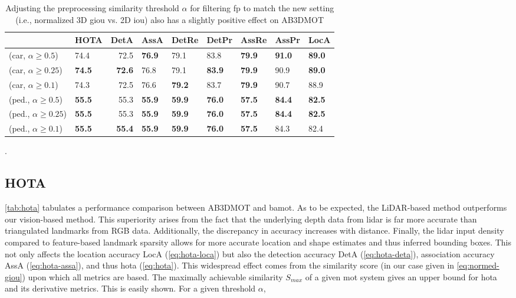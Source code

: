 \documentclass[headsepline, hidelinks, footsepline, footinclude=false, oneside, fontsize=11pt, paper=a4, listof=totoc, bibliography=totoc]{scrbook}
\begin{document}
\begin{table}
\centering
{} {

\begin{tabular}{llrllllll}
 & HOTA & DetA & AssA & DetRe & DetPr & AssRe & AssPr & LocA\\
\hline
\cite{wengBaseline3DMultiObject2019} (car, \(\alpha \geq 0.5\)) & 74.4 & 72.5 & \textbf{76.9} & 79.1 & 83.8 & \textbf{79.9} & \textbf{91.0} & \textbf{89.0}\\
\cite{wengBaseline3DMultiObject2019} (car, \(\alpha \geq 0.25\)) & \textbf{74.5} & \textbf{72.6} & 76.8 & 79.1 & \textbf{83.9} & \textbf{79.9} & 90.9 & \textbf{89.0}\\
\cite{wengBaseline3DMultiObject2019} (car, \(\alpha \geq 0.1\)) & 74.3 & 72.5 & 76.6 & \textbf{79.2} & 83.7 & \textbf{79.9} & 90.7 & 88.9\\
\hline
\cite{wengBaseline3DMultiObject2019} (ped., \(\alpha \geq 0.5\)) & \textbf{55.5} & 55.3 & \textbf{55.9} & \textbf{59.9} & \textbf{76.0} & \textbf{57.5} & \textbf{84.4} & \textbf{82.5}\\
\cite{wengBaseline3DMultiObject2019} (ped., \(\alpha \geq 0.25\)) & \textbf{55.5} & 55.3 & \textbf{55.9} & \textbf{59.9} & \textbf{76.0} & \textbf{57.5} & \textbf{84.4} & \textbf{82.5}\\
\cite{wengBaseline3DMultiObject2019} (ped., \(\alpha \geq 0.1\)) & \textbf{55.5} & \textbf{55.4} & \textbf{55.9} & \textbf{59.9} & \textbf{76.0} & \textbf{57.5} & 84.3 & 82.4\\
\end{tabular}

}
\caption{Adjusting the preprocessing similarity threshold $\alpha$ for filtering \gls{fp} to match the new setting (i.e., normalized 3D \gls{giou} vs. 2D \gls{iou}) also has a slightly positive effect on AB3DMOT}.
\label{tab:thresholds}
\end{table}

\subsection{HOTA}
\label{sec:org6245977}
    \cref{tab:hota} tabulates a performance comparison between AB3DMOT and \gls{bamot}. As to be expected, the LiDAR-based method outperforms our vision-based method.
This superiority arises from the fact that the underlying depth data from \gls{lidar} is far more accurate than triangulated landmarks from RGB data. 
Additionally, the discrepancy in accuracy increases with distance.
Finally, the \gls{lidar} input density compared to feature-based landmark sparsity allows for more accurate location and shape estimates and thus inferred bounding boxes. 
This not only affects the location accuracy LocA (\cref{eq:hota-loca}) but also the detection accuracy DetA (\cref{eq:hota-deta}), association accuracy AssA (\cref{eq:hota-assa}),
and thus \gls{hota} (\cref{eq:hota}).
This widespread effect comes from the similarity score (in our case given in \cref{eq:normed-giou}) upon which all metrics are based.
The maximally achievable similarity \(S_{max}\) of a given \gls{mot} system gives an upper bound for \gls{hota} and its derivative metrics.
This is easily shown. For a given threshold \(\alpha\), 
\end{document}
